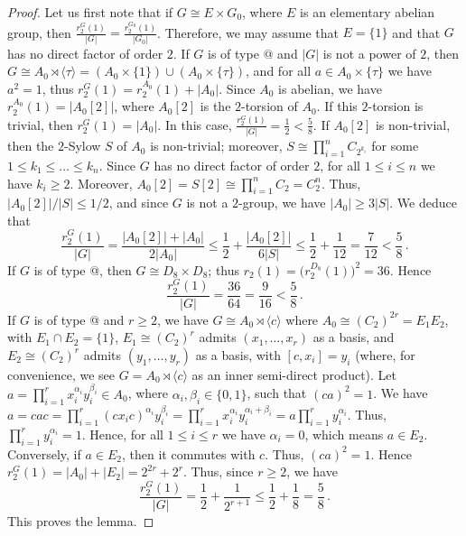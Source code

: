 \documentclass[12pt]{amsart}
\makeatletter
\numberwithin{equation}{section}
\newcommand*{\rom}[1]{\expandafter\@slowromancap\romannumeral #1@}
\theoremstyle{definition}
\theoremstyle{remark}
\makeatother
\begin{document}
    \begin{proof}
        Let us first note that if $G\cong E\times G_0$, where $E$ is an elementary abelian group, then $\frac{r_2^G(1)}{|G|}=\frac{r_2^{G_0}(1)}{|G_0|}$. Therefore, we may assume that $E=\{1\}$ and that $G$ has no direct factor of order $2$. If $G$ is of type \rom{1} and $|G|$ is not a power of $2$, then $G\cong A_0\rtimes\langle \tau\rangle=(A_0\times\{1\})\cup (A_0\times\{\tau\})$, and for all $a\in A_0\times\{\tau\}$ we have $a^2=1$, thus $r_2^G(1)=r_2^{A_0}(1)+|A_0|$. Since $A_0$ is abelian, we have $r_2^{A_0}(1)=\bigl|A_0[2]\bigr|$, where $A_0[2]$ is the $2$-torsion of $A_0$. If this $2$-torsion is trivial, then $r_2^G(1)=|A_0|$. In this case, $\frac{r_2^G(1)}{|G|}=\frac{1}{2}<\frac{5}{8}$. If $A_0[2]$ is non-trivial, then the $2$-Sylow $S$ of $A_0$ is non-trivial; moreover, $S\cong \prod_{i=1}^n C_{2^{k_i}}$ for some $1\le k_1\le\dots\le k_n $. Since $G$ has no direct factor of order $2$, for all $1\le i\le n$ we have $k_i\ge 2$. Moreover, $A_0[2]=S[2]\cong \prod_{i=1}^n C_2=C_2^n$. Thus, $\bigl| A_0[2]\bigr|/ \bigl| S\bigr| \le 1/2$, and since $G$ is not a $2$-group, we have $|A_0|\ge 3|S|$. We deduce that 
        \[\frac{r_2^G(1)}{|G|}=\frac{\bigl|A_0[2]\bigr|+|A_0|}{2|A_0|}\le \frac{1}{2}+\frac{\bigl|A_0[2]\bigr|}{6|S|}\le \frac{1}{2}+\frac{1}{12}=\frac{7}{12}<\frac{5}{8}\, .\]
        If $G$ is of type \rom{2}, then $G\cong D_8\times D_8$; thus $r_2(1)=\bigl(r_2^{D_8}(1)\bigr)^2=36$. Hence \[\frac{r_2^G(1)}{|G|}=\frac{36}{64}=\frac{9}{16}<\frac{5}{8}\, .\]
        If $G$ is of type \rom{4} and $r\ge 2$, we have $G\cong A_0\rtimes \langle c\rangle$ where $A_0\cong (C_2)^{2r}=E_1E_2$, with $E_1\cap E_2=\{1\}$, $E_1\cong (C_2)^r$ admits $(x_1,\dots,x_r)$ as a basis, and $E_2\cong (C_2)^r$ admits $(y_1,\dots,y_r)$ as a basis, with $[c,x_i]=y_i$ (where, for convenience, we see $G= A_0\rtimes \langle c\rangle$ as an inner semi-direct product). Let $a=\prod_{i=1}^r x_i^{\alpha_i} y_i^{\beta_i}\in A_0$, where $\alpha_i,\beta_i\in \{0,1\}$, such that $(ca)^2=1$. We have $a=cac=\prod_{i=1}^r (cx_ic)^{\alpha_i}y_i^{\beta_i}=\prod_{i=1}^r x_i^{\alpha_i}y_i^{\alpha_i+\beta_i}=a\prod_{i=1}^ry_i^{\alpha_i}$. Thus, $\prod_{i=1}^ry_i^{\alpha_i}=1$. Hence, for all $1\le i\le r$ we have $\alpha_i=0$, which means $a\in E_2$. Conversely, if $a\in E_2$, then it commutes with $c$. Thus, $(ca)^2=1$. Hence $r_2^G(1)=|A_0|+|E_2|=2^{2r}+2^r$. Thus, since $r\ge2$, we have \[\frac{r_2^G(1)}{|G|}=\frac{1}{2}+\frac{1}{2^{r+1}}\le \frac{1}{2}+\frac{1}{8}=\frac{5}{8}\, .\]
        This proves the lemma.
    \end{proof}
\end{document}
